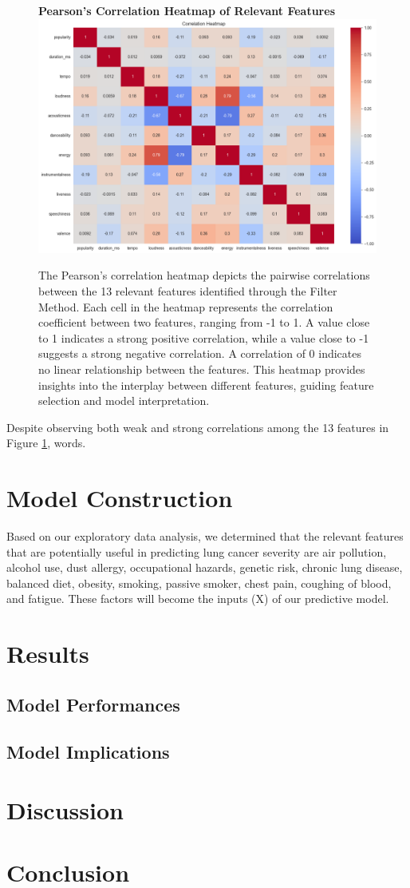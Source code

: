 \documentclass[times, twocolumn]{article}
\begin{document}
\begin{figure}[H]
    \centering
    \textbf{Pearson's Correlation Heatmap of Relevant Features}
    \includegraphics[width=1.0\linewidth]{corr_heatmap.png}
    \caption{The Pearson's correlation heatmap depicts the pairwise correlations between the 13 relevant features identified through the Filter Method. Each cell in the heatmap represents the correlation coefficient between two features, ranging from -1 to 1. A value close to 1 indicates a strong positive correlation, while a value close to -1 suggests a strong negative correlation. A correlation of 0 indicates no linear relationship between the features. This heatmap provides insights into the interplay between different features, guiding feature selection and model interpretation.}
    \label{heatmap}
\end{figure}

Despite observing both weak and strong correlations among the 13 features in Figure \ref{heatmap}, words.

\section{Model Construction}
Based on our exploratory data analysis, we determined that the relevant features that are potentially useful in predicting lung cancer severity are air pollution, alcohol use, dust allergy, occupational hazards, genetic risk, chronic lung disease, balanced diet, obesity, smoking, passive smoker, chest pain, coughing of blood, and fatigue. These factors will become the inputs (X) of our predictive model.

\section{Results}
\subsection{Model Performances}


\subsection{Model Implications}

\section{Discussion}

\section{Conclusion}

\printbibliography
\end{document}
